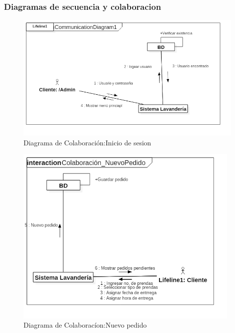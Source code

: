 \newpage

\subsubsection{Diagramas de secuencia y colaboracion}

\begin{figure}[htb]
\begin{center}
\includegraphics[width=14cm]{./imagenes/diagramas/Colaboracion_IniciarSesion.png}
\end{center}
\caption{Diagrama de Colaboración:Inicio de sesion}
\end{figure}


\begin{figure}[htb]
\begin{center}
\includegraphics[width=11cm]{./imagenes/diagramas/Colaboracion_NuevoPedido.png}
\end{center}
\caption{Diagrama de Colaboracíon:Nuevo pedido}
\end{figure}


